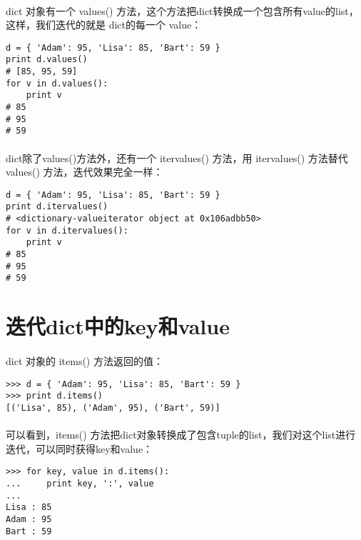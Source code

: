 \documentclass{article}
\begin{document}
\begin{CJK}{UTF8}{gbsn}
\paragraph{}
dict 对象有一个 values() 方法，这个方法把dict转换成一个包含所有value的list，这样，我们迭代的就是 dict的每一个 value：
\begin{verbatim}
d = { 'Adam': 95, 'Lisa': 85, 'Bart': 59 }
print d.values()
# [85, 95, 59]
for v in d.values():
    print v
# 85
# 95
# 59
\end{verbatim}
\paragraph{}
dict除了values()方法外，还有一个 itervalues() 方法，用 itervalues() 方法替代 values() 方法，迭代效果完全一样：
\begin{verbatim}
d = { 'Adam': 95, 'Lisa': 85, 'Bart': 59 }
print d.itervalues()
# <dictionary-valueiterator object at 0x106adbb50>
for v in d.itervalues():
    print v
# 85
# 95
# 59
\end{verbatim}
\section{迭代dict中的key和value}
\paragraph{}
dict 对象的 items() 方法返回的值：
\begin{verbatim}
>>> d = { 'Adam': 95, 'Lisa': 85, 'Bart': 59 }
>>> print d.items()
[('Lisa', 85), ('Adam', 95), ('Bart', 59)]
\end{verbatim}
\paragraph{}
可以看到，items() 方法把dict对象转换成了包含tuple的list，我们对这个list进行迭代，可以同时获得key和value：
\begin{verbatim}
>>> for key, value in d.items():
...     print key, ':', value
... 
Lisa : 85
Adam : 95
Bart : 59
\end{verbatim}
\end{CJK}
\end{document}

